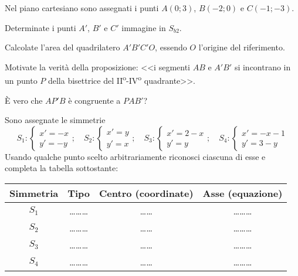 \begin{esercizio}
	\label{ese:8.38} %
	Nel piano cartesiano sono assegnati i punti \(A(0;3)\), \(B(-2;0)\) e 
	\(C(-1;-3)\).
	\begin{enumeratea}
		\item Determinate i punti \(A'\), \(B'\) e \(C'\) immagine in \(S_{b2}\).
		\item Calcolate l'area del quadrilatero \(A'B'C'O\), essendo \(O\) 
		l'origine del riferimento.
		\item Motivate la verità della proposizione: <<i segmenti \(AB\) e 
		\(A'B'\) si incontrano in un punto \(P\) della bisettrice del 
		II\textsuperscript{o}-IV\textsuperscript{o} quadrante>>.
		\item \`E vero che \(AP'B\) è congruente a \(PAB'\)?
	\end{enumeratea}
\end{esercizio}

\begin{esercizio}
	\label{ese:8.39} %
	Sono assegnate le simmetrie
	\[S_1:\begin{cases}x'=-x\\y'=-y\end{cases};\quad 
	S_2:\begin{cases}x'=y\\y'=x\end{cases};\quad
	S_3:\begin{cases}x'=2-x\\y'=y\end{cases};\quad 
	S_4:\begin{cases}x'=-x-1\\y'=3-y\end{cases}\]
	Usando qualche punto scelto arbitrariamente riconosci ciascuna di 
	esse e completa la tabella sottostante:
	\begin{center}
		\begin{tabular}{cccc}
			\toprule
			Simmetria & Tipo & Centro (coordinate) & Asse (equazione)\\
			\midrule
			\(S_1\) & \ldots\ldots\ldots{} & \ldots\ldots{} & \ldots\ldots\ldots{} 
			\\
			\(S_2\) & \ldots\ldots\ldots{} & \ldots\ldots{} & \ldots\ldots\ldots{} 
			\\
			\(S_3\) & \ldots\ldots\ldots{} & \ldots\ldots{} & \ldots\ldots\ldots{} 
			\\
			\(S_4\) & \ldots\ldots\ldots{} & \ldots\ldots{} & \ldots\ldots\ldots{} 
			\\
			\bottomrule
		\end{tabular}
	\end{center}
\end{esercizio}

